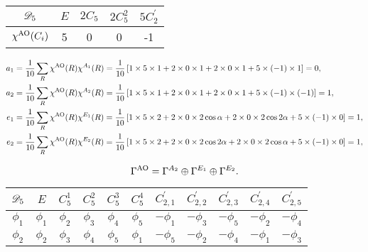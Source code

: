 \documentclass[a4paper]{book}
\newcommand{\AO}{{\rm AO}}
\begin{document}
\begin{solution}
\begin{enumerate}[label=(\alph*)]
		
		\begin{center}
		\begin{tabular}{ccccc}\hline
	$\mathscr{D}_{\rm 5}$	& $E$ & $2C_5$ &	$2C^2_5$	& $5C^\prime_2$ \\ \hline
	$\chi^{\AO}(C_i)$	&	5	&	0	&	0	&	-1	\\ \hline
		\end{tabular}
		\end{center}
		
		\begin{align*}
		a_1 &= \frac{1}{10} \sum_{R} \chi^{\AO}(R) \chi^{A_1}(R) = \frac{1}{10} \left[ 1 \times 5 \times 1 + 2 \times 0 \times 1 + 2 \times 0 \times 1 + 5 \times (-1) \times 1 \right] = 0, \\		
		a_2 &= \frac{1}{10} \sum_{R} \chi^{\AO}(R) \chi^{A_2}(R) = \frac{1}{10} \left[ 1 \times 5 \times 1 + 2 \times 0 \times 1 + 2 \times 0 \times 1 + 5 \times (-1) \times (-1) \right] = 1, \\
		e_1 &= \frac{1}{10} \sum_{R} \chi^{\AO}(R) \chi^{E_1}(R) = \frac{1}{10} \left[ 1 \times 5 \times 2 + 2 \times 0 \times 2\cos\alpha + 2 \times 0 \times 2\cos2\alpha + 5 \times (-1) \times 0 \right] = 1, \\		
		e_2 &= \frac{1}{10} \sum_{R} \chi^{\AO}(R) \chi^{E_2}(R) = \frac{1}{10} \left[ 1 \times 5 \times 2 + 2 \times 0 \times 2\cos2\alpha + 2 \times 0 \times 2\cos\alpha + 5 \times (-1) \times 0 \right] = 1, \\
		\end{align*}
		
		\begin{equation*}
			\Gamma^{\AO} = \Gamma^{A_2} \oplus \Gamma^{E_1} \oplus \Gamma^{E_2}.
		\end{equation*}
		
		\begin{center}
		\begin{tabular}{ccccccccccc}\hline
	$\mathscr{D}_{\rm 5}$ & $E$ & $C^1_5$ & $C^2_5$ & $C^3_5$	&	$C^4_5$	&	$C^\prime_{2,1}$	&	$C^\prime_{2,2}$ &	$C^\prime_{2,3}$	&	$C^\prime_{2,4}$	&	$C^\prime_{2,5}$	\\ \hline
			$\phi_1$	&	$\phi_1$	&	$\phi_2$	&	$\phi_3$	&	$\phi_4$	&	$\phi_5$	&	$-\phi_1$	&	$-\phi_3$	&	$-\phi_5$	&	$-\phi_2$	&	$-\phi_4$	\\
			$\phi_2$	&	$\phi_2$	&	$\phi_3$	&	$\phi_4$	&	$\phi_5$	&	$\phi_1$	&	$-\phi_5$	&	$-\phi_2$	&	$-\phi_4$	&	$-\phi_1$	&	$-\phi_3$	\\ \hline
		\end{tabular}
		\end{center}
		

\end{enumerate}
\end{solution}
\end{document}

